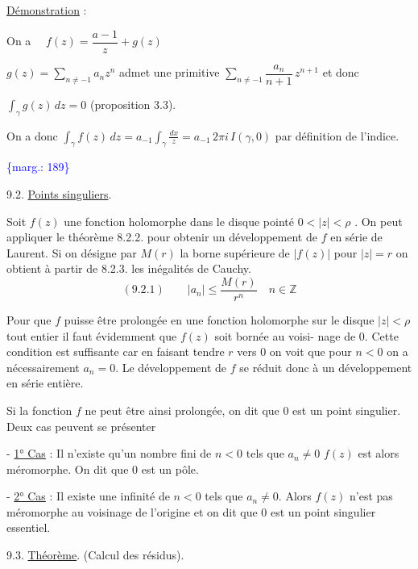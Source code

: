\documentclass[11pt]{article}
\newcommand{\scanpage}[1]{\par\bigskip\noindent{\small\sffamily[scan #1]}\par}
\newcommand{\mspage}[1]{{\small\sffamily[p.\,#1]}}
\newcommand{\margin}[1]{\textcolor{blue}{\{\textsf{marg.:} #1\}}}
\newcommand{\uline}[1]{\underline{#1}}
\begin{document}
\uline{Démonstration} :

On a $\quad f(z) = \dfrac{a-1}{z} + g(z)$

$g(z) = \sum\limits_{n\neq -1} a_n z^n$ admet une primitive $\sum\limits_{n\neq -1} \dfrac{a_n}{n+1}\, z^{n+1}$ et donc

$\displaystyle\int_\gamma g(z)\,dz = 0$ \quad (proposition 3.3).

On a donc $\displaystyle\int_\gamma f(z)\,dz = a_{-1}\int_\gamma \frac{dx}{z} = a_{-1}\, 2\pi i\, I(\gamma,0)$ par définition de
l'indice.

\margin{189}

\clearpage
\scanpage{119/190}
\mspage{- 9 -}

9.2. \uline{Points singuliers}.

Soit $f(z)$ une fonction holomorphe dans le disque pointé
$0 < |z| < \rho$ . On peut appliquer le théorème 8.2.2. pour obtenir un développement
de $f$ en série de Laurent. Si on désigne par $M(r)$ la borne supérieure de
$|f(z)|$ pour $|z| = r$ on obtient à partir de 8.2.3. les inégalités de Cauchy.
\[ (9.2.1) \qquad |a_n| \leq \frac{M(r)}{r^n} \quad n \in \mathbb{Z} \]

Pour que $f$ puisse être prolongée en une fonction holomorphe sur le
disque $|z| < \rho$ tout entier il faut évidemment que $f(z)$ soit bornée au voisi-%
nage de $0$. Cette condition est suffisante car en faisant tendre $r$ vers $0$
on voit que pour $n < 0$ on a nécessairement $a_n = 0$. Le développement de $f$ se
réduit donc à un développement en série entière.

Si la fonction $f$ ne peut être ainsi prolongée, on dit que $0$ est
un point singulier. Deux cas peuvent se présenter

- \uline{1° Cas} : Il n'existe qu'un nombre fini de $n < 0$ tels que $a_n \neq 0$
$f(z)$ est alors méromorphe. On dit que $0$ est un pôle.

- \uline{2° Cas} : Il existe une infinité de $n < 0$ tels que $a_n \neq 0$. Alors
$f(z)$ n'est pas méromorphe au voisinage de l'origine et on dit que $0$ est un
point singulier essentiel.

9.3. \uline{Théorème}. (Calcul des résidus).
\end{document}
